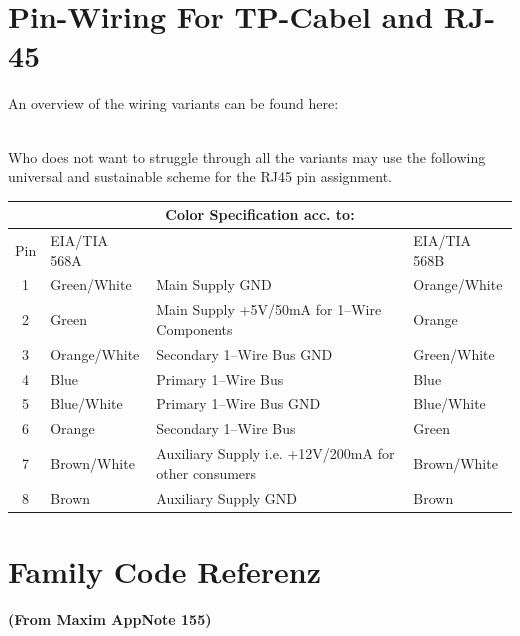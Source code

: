 {
\section{Pin-Wiring For TP-Cabel and RJ-45}
}

An overview of the wiring variants can be found here:

\\

Who does not want to struggle through all the variants may use the following universal
and sustainable scheme for the RJ45 pin assignment.\\

\begin{center}
\begin{tabular}{|c|l|l|l|}
\hline
   \multicolumn{4}{|c|}{Color Specification acc. to:} \\ \hline
Pin & EIA/TIA 568A &                                             & EIA/TIA 568B \\ \hline
1   & Green/White  & Main Supply GND                             & Orange/White  \\ \hline
2   & Green        & Main Supply +5V/50mA for 1--Wire Components & Orange \\ \hline
3   & Orange/White & Secondary 1--Wire Bus GND                   & Green/White \\ \hline
4   & Blue         & Primary 1--Wire Bus                         & Blue \\ \hline
5   & Blue/White   & Primary 1--Wire Bus GND                     & Blue/White \\ \hline
6   & Orange       & Secondary 1--Wire Bus                       & Green \\ \hline
7   & Brown/White  & Auxiliary Supply i.e. +12V/200mA for other consumers
                                                                 & Brown/White \\ \hline
8   & Brown        & Auxiliary Supply GND                        & Brown \\ \hline
\end{tabular}
\end{center}


{
\section{Family Code Referenz}
}
\textbf{(From Maxim AppNote 155)}

